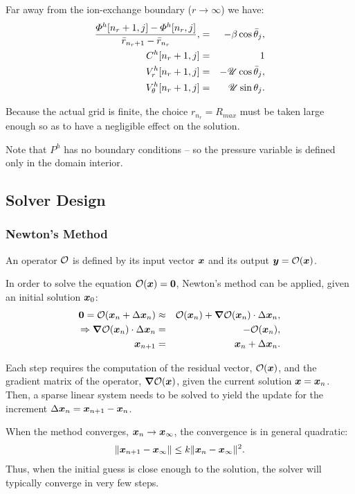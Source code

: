 Far away from the ion-exchange boundary ($r\rightarrow\infty$) we have:
\begin{eqnarray}
\frac{\varPhi^h[n_r + 1, j] - \varPhi^h[n_r, j]}{\bar{r}_{n_r + 1} - \bar{r}_{n_r}}, 
 & = & -\beta \cos\bar{\theta}_j, \\
C^h[n_r + 1, j] & = & 1 \\
V_r^h[n_r + 1, j] & = & -\mathscr{U} \cos\bar{\theta}_j, \\
V_\theta^h[n_r + 1, j] & = & \mathscr{U} \sin\theta_j.
\end{eqnarray}

Because the actual grid is finite, the choice 
$r_{n_r} = R_{max}$ must be taken large enough so as to have a negligible effect
on the solution.

Note that $P^h$ has no boundary conditions -- so the pressure variable is defined 
only in the domain interior.

\subsection{Solver Design}
\subsubsection{Newton's Method}
An operator $\mathcal{O}$ is defined by its input vector $\boldsymbol{x}$ and its output 
$\boldsymbol{y} = \mathcal{O}(\boldsymbol{x})$.

In order to solve the equation $\mathcal{O}(\boldsymbol{x}) = \boldsymbol{0}$, Newton's method can 
be applied, given an initial solution $\boldsymbol{x}_0$:
\begin{eqnarray}
\boldsymbol{0} = \mathcal{O}(\boldsymbol{x}_n + \Delta \boldsymbol{x}_n) &\approx& \mathcal{O}(\boldsymbol{x}_n) + \boldsymbol{\nabla} \mathcal{O}(\boldsymbol{x}_n)\cdot\Delta\boldsymbol{x}_n, \\
\Rightarrow \boldsymbol{\nabla} \mathcal{O}(\boldsymbol{x}_n) \cdot \Delta \boldsymbol{x}_n &=& -\mathcal{O}(\boldsymbol{x}_n), \\
\boldsymbol{x}_{n+1} &=& \boldsymbol{x}_{n} + \Delta \boldsymbol{x}_n. 
\end{eqnarray}

Each step requires the computation of the residual vector, $\mathcal{O}(\boldsymbol{x})$, and
the gradient matrix of the operator, $\boldsymbol{\nabla} \mathcal{O}(\boldsymbol{x})$, 
given the current solution $\boldsymbol{x} = \boldsymbol{x}_n$.
Then, a sparse linear system needs to be solved to yield the update for the 
increment $\Delta \boldsymbol{x}_n = \boldsymbol{x}_{n+1} - \boldsymbol{x}_n$.

When the method converges, $\boldsymbol{x}_n \rightarrow \boldsymbol{x}_\infty$, 
the convergence is in general quadratic:
\begin{eqnarray}
\|\boldsymbol{x}_{n+1} - \boldsymbol{x}_\infty\| \le k \|\boldsymbol{x}_{n} - \boldsymbol{x}_\infty\|^2.
\end{eqnarray}
Thus, when the initial guess is close enough to the solution, the solver
will typically converge in very few steps.

